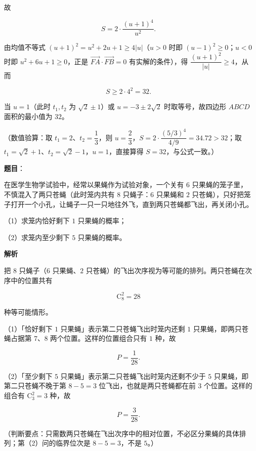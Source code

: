 \begin{answer}
故

\nopagebreak[4]
\[S=2\cdot\frac{(u+1)^4}{u^2}.\]

由均值不等式 $(u+1)^2=u^2+2u+1\geqslant4|u|$（$u>0$ 时即 $(u-1)^2\geqslant0$；$u<0$ 时即 $u^2+6u+1\geqslant0$，正是 $\overrightarrow{FA}\cdot\overrightarrow{FB}=0$ 有实解的条件），得 $\dfrac{(u+1)^2}{|u|}\geqslant4$，从而

\nopagebreak[4]
\[S\geqslant2\cdot4^2=32.\]

当 $u=1$（此时 $t_1,t_2$ 为 $\sqrt2\pm1$）或 $u=-3\pm2\sqrt2$ 时取等号，故四边形 $ABCD$ 面积的最小值为 $32$。

（数值验算：取 $t_1=2$、$t_2=\dfrac13$，则 $u=\dfrac23$，$S=2\cdot\dfrac{(5/3)^4}{4/9}=34.72>32$；取 $t_1=\sqrt2+1$、$t_2=\sqrt2-1$，$u=1$，直接算得 $S=32$，与公式一致。）


\end{answer}
\begin{answer}

\textbf{题目}：

在医学生物学试验中，经常以果蝇作为试验对象，一个关有 $6$ 只果蝇的笼子里，不慎混入了两只苍蝇（此时笼内共有 $8$ 只蝇子：$6$ 只果蝇和 $2$ 只苍蝇），只好把笼子打开一个小孔，让蝇子一只一只地往外飞，直到两只苍蝇都飞出，再关闭小孔。

（1）求笼内恰好剩下 $1$ 只果蝇的概率；

（2）求笼内至少剩下 $5$ 只果蝇的概率。

\textbf{解析}

把 $8$ 只蝇子（$6$ 只果蝇、$2$ 只苍蝇）的飞出次序视为等可能的排列。两只苍蝇在次序中的位置共有

\nopagebreak[4]
\[\mathrm C_8^2=28\]

种等可能情形。

（1）「恰好剩下 $1$ 只果蝇」表示第二只苍蝇飞出时笼内还剩 $1$ 只果蝇，即两只苍蝇占据第 $7$、$8$ 两个位置。这样的位置组合只有 $1$ 种，故

\nopagebreak[4]
\[P=\frac{1}{28}.\]

（2）「至少剩下 $5$ 只果蝇」表示第二只苍蝇飞出时笼内还剩不少于 $5$ 只果蝇，即第二只苍蝇不晚于第 $8-5=3$ 位飞出，也就是两只苍蝇都在前 $3$ 个位置。这样的组合有 $\mathrm C_3^2=3$ 种，故

\nopagebreak[4]
\[P=\frac{3}{28}.\]

（判断要点：只需数两只苍蝇在飞出次序中的相对位置，不必区分果蝇的具体排列；第（2）问的临界位次是 $8-5=3$，不是 $5$。）


\end{answer}
